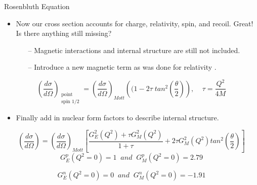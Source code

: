 \documentclass[10pt]{beamer}
\begin{document}
\begin{frame}[fragile]{Rosenbluth Equation}
	\begin{itemize}
		\item Now our cross section accounts for \alert{charge}, \alert{relativity}, \alert{spin}, and \alert{recoil}. Great! Is there anything still missing?
			\begin{itemize}
				\pause
				\item[--] \alert{Magnetic interactions} and \alert{internal structure} are still not included. 
				\item[--] Introduce a new \alert{magnetic term} as was done for relativity \cite{Book:Povh}.
			\end{itemize}
	\end{itemize}
	\pause
	\begin{equation} \label{eq:mag}
		\left(\frac{d\sigma}{d\Omega}\right)_{\substack{ \text{point} \\ \text{spin 1/2}}} = \left( \frac{d\sigma}{d\Omega} \right)_{Mott} \left( (1-2\tau \; tan^2\left( \frac{\theta}{2} \right) \right), \;\;\;\; \tau = \frac{Q^2}{4M}
	\end{equation}
	\pause
	\begin{itemize}
		\item Finally add in \alert{nuclear form factors} to describe internal structure.
	\end{itemize}
	\pause
	\begin{equation} \label{eq:rosenbluth_long}
		\left(\frac{d\sigma}{d\Omega}\right) = \left( \frac{d\sigma}{d\Omega} \right)_{Mott} \left[ 	\frac{G_E^2\left(Q^2\right)+\tau G_M^2\left(Q^2\right)}{1+\tau} + 2 \tau G_M^2\left(Q^2\right) tan^2\left( \frac{\theta}{2} \right) \right]
	\end{equation}
	\pause
	\begin{equation} \label{eq:ge_0}
		G_E^p\left(Q^2=0\right) = 1 \;\; and \;\; G_M^p\left(Q^2=0\right) = 2.79
	\end{equation}

	\begin{equation} \label{eq:gm_0}
		G_E^n\left(Q^2=0\right) = 0 \;\; and \;\; G_M^n\left(Q^2=0\right) = -1.91
	\end{equation}
\end{frame}
\end{document}
